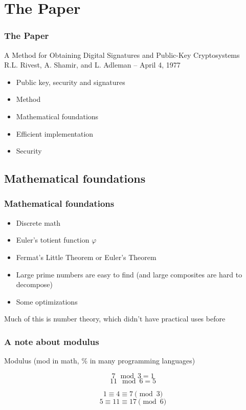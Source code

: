 \documentclass{beamer}
\begin{document}
\section{The Paper}

\begin{frame}
	\frametitle{The Paper}
		A Method for Obtaining Digital Signatures and Public-Key Cryptosystems \\
		R.L. Rivest, A. Shamir, and L. Adleman -- April 4, 1977
		\begin{itemize}
			\item Public key, security and signatures
			\item Method
			\item Mathematical foundations
			\item Efficient implementation
			\item Security
		\end{itemize}
\end{frame}

\subsection{Mathematical foundations}

\begin{frame}
	\frametitle{Mathematical foundations}
	\begin{itemize}
		\item Discrete math
		\item Euler's totient function $\varphi$
		\item Fermat's Little Theorem or Euler's Theorem
		\item Large prime numbers are easy to find (and large
		      composites are hard to decompose)
		\item Some optimizations
	\end{itemize}

	Much of this is number theory, which didn't have practical
        uses before
\end{frame}

\begin{frame}
	\frametitle{A note about modulus}

	Modulus (mod in math, \% in many programming languages)

	$$ 7 \mod 3 = 1 $$
	$$ 11 \mod 6 = 5 $$

	$$ 1 \equiv 4 \equiv 7 \pmod{3} $$
	$$ 5 \equiv 11 \equiv 17 \pmod{6} $$
\end{frame}
\end{document}

